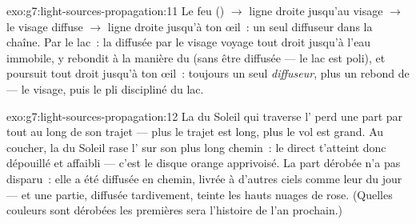 \begin{solution}{exo:g7:light-sources-propagation:11}
Le feu () $\to$ ligne droite jusqu'au visage $\to$ le
visage diffuse $\to$ ligne droite jusqu'à ton œil~: un seul diffuseur
dans la chaîne. Par le lac~: la  diffusée par le visage
voyage tout droit jusqu'à l'eau immobile, y rebondit à la manière du
 (sans être diffusée --- le lac est poli), et poursuit tout
droit jusqu'à ton œil~: toujours un seul \emph{diffuseur}, plus un
rebond de  --- le visage, puis le pli discipliné du lac.
\end{solution}

\begin{solution}{exo:g7:light-sources-propagation:12}
La  du Soleil qui traverse l' perd une part par 
tout au long de son trajet --- plus le trajet est long, plus le vol
est grand. Au coucher, la  du Soleil rase l' sur son
plus long chemin~: le  direct t'atteint donc dépouillé et
affaibli --- c'est le disque orange apprivoisé. La part dérobée n'a
pas disparu~: elle a été diffusée en chemin, livrée à d'autres ciels
comme leur  du jour --- et une partie, diffusée tardivement,
teinte les hauts nuages de rose. (Quelles couleurs sont dérobées les
premières sera l'histoire de l'an prochain.)
\end{solution}

